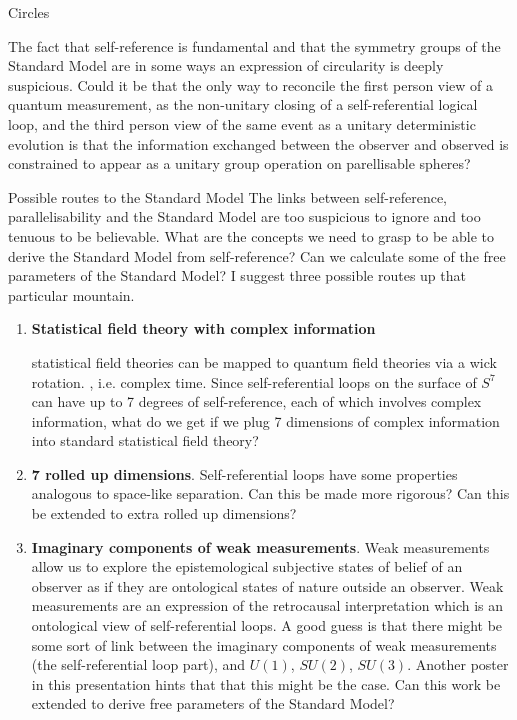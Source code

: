 \documentclass[final]{beamer}
\newlength{\colwidth}
\begin{document}
\begin{frame}[t]
\begin{columns}[t]
\begin{column}{\colwidth}
\begin{block}{Circles}
\par 
The fact that self-reference is fundamental and that the symmetry groups of the Standard Model are in some ways an expression of circularity is deeply suspicious. Could it be that the only way to reconcile the first person view of a quantum measurement, as the non-unitary closing of a self-referential logical loop, and the third person view of the same event as a unitary deterministic evolution is that the information exchanged between the observer and observed is constrained to appear as a unitary group operation on parellisable spheres?
\end{block}

  \begin{block}{Possible routes to the Standard Model}
The links between self-reference, parallelisability and the Standard Model are too suspicious to ignore and too tenuous to be believable. What are the concepts we need to grasp to be able to derive the Standard Model from self-reference? Can we calculate some of the free parameters of the Standard Model? I suggest three possible routes up that particular mountain.
    \begin{enumerate}
      \item \textbf{Statistical field theory with complex information}\\
      \par statistical field theories can be mapped to quantum field theories via a wick rotation. \autocite{Peskin_and_schroder_95}, i.e. complex time. Since self-referential loops on the surface of $S^7$ can have up to 7 degrees of self-reference, each of which involves complex information, what do we get if we plug 7 dimensions of complex information into standard statistical field theory?
      \item \textbf{7 rolled up dimensions}. Self-referential loops have some properties analogous to space-like separation. Can this be made more rigorous? Can this be extended to extra rolled up dimensions?
      \item \textbf{Imaginary components of weak measurements}. Weak measurements allow us to explore the epistemological subjective states of belief of an observer as if they are ontological states of nature outside an observer. Weak measurements are an expression of the retrocausal interpretation \autocite{ElitzurCohen-2011} which is an ontological view of self-referential loops. A good guess is that there might be some sort of link between the imaginary components of weak measurements (the self-referential loop part), and $U(1)$, $SU(2)$, $SU(3)$. Another poster in this presentation \autocite{Ferraz2022GeometricalSystems} hints that that this might be the case. Can this work be extended to derive free parameters of the Standard Model?

\end{enumerate}
\end{block}
\end{column}
\end{columns}
\end{frame}
\end{document}
